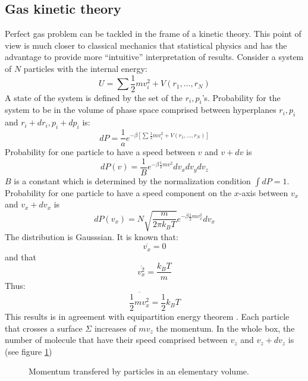 \documentclass[12pt]{book}
\begin{document}
\subsection{Gas kinetic theory}
Perfect gas problem can be tackled in the frame of a
kinetic theory. This point of view is much
closer to classical mechanics that statistical physics and has the advantage to
provide more ``intuitive'' interpretation of results.
Consider a system of $N$ particles with the internal energy:
\begin{equation}
U=\sum \frac{1}{2}mv_i^2+V(r_1,\dots,r_N)
\end{equation}
A state of the system is defined by the set of the $r_i,p_i$'s. Probability
for the system to be in the volume of phase space comprised between
hyperplanes  $r_i,p_i$  and $r_i+dr_i,p_i+dp_i$ is:
\begin{equation}
dP=\frac{1}{a}e^{-\beta[\sum \frac{1}{2}mv_i^2+V(r_1,\dots,r_N)]}
\end{equation}
Probability for one particle to have a speed between $v$ and $v+dv$ is
\begin{equation}
dP(v)=\frac{1}{B}e^{-\beta \frac{1}{2}mv^2}dv_xdv_ydv_z
\end{equation}
$B$ is a constant which is determined by the normalization condition $\int dP
=1$. Probability for one particle to have a speed component on the $x$-axis
between $v_x$ and $v_x+dv_x$ is 
\begin{equation}
dP(v_x)=N\sqrt{\frac{m}{2\pi k_BT}}e^{-\beta \frac{1}{2}mv_x^2}dv_x
\end{equation}
The distribution is Gausssian. It is known that:
\begin{equation}
\overline{v_x}=0
\end{equation}
and that
\begin{equation}
\overline{v^2_x}=\frac{k_BT}{m}
\end{equation}
Thus:
\begin{equation}
\overline{\frac{1}{2}mv^2_x}=\frac{1}{2}k_BT
\end{equation}
This results is in agreement with equipartition energy theorem \cite{ph:physt:Diu89}.
Each particle that crosses a surface $\Sigma$ increases of
$mv_z$ the momentum.
In the whole box, the number of molecule that have their speed comprised
between $v_z$ and $v_z+dv_z$ is (see figure \ref{figboite})
\begin{figure}[htb]
 \centerline{}   
 \caption{Momentum  transfered by particles in an elementary volume.}
 \label{figboite}
\end{figure}
\end{document}
